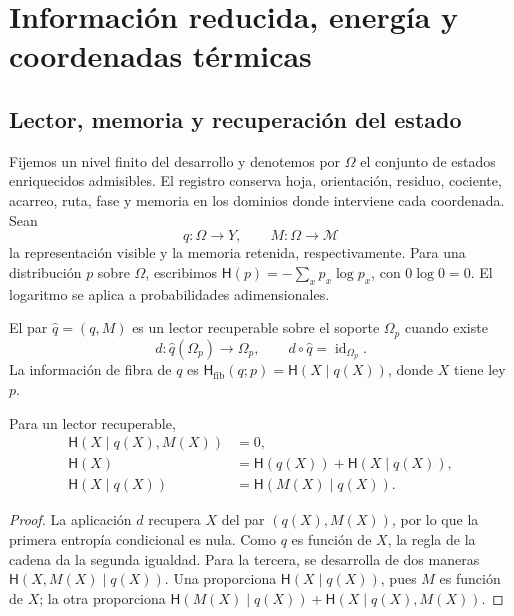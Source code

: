 \section{Información reducida, energía y coordenadas térmicas}

\subsection{Lector, memoria y recuperación del estado}

Fijemos un nivel finito del desarrollo y denotemos por \(\Omega\) el
conjunto de estados enriquecidos admisibles. El registro conserva hoja,
orientación, residuo, cociente, acarreo, ruta, fase y memoria en los
dominios donde interviene cada coordenada. Sean
\[
 q:\Omega\longrightarrow Y,\qquad
 M:\Omega\longrightarrow\mathcal M
\]
la representación visible y la memoria retenida, respectivamente. Para una
distribución \(p\) sobre \(\Omega\), escribimos
\(\mathsf H(p)=-\sum_xp_x\log p_x\), con \(0\log0=0\).
El logaritmo se aplica a probabilidades adimensionales.

\begin{definition}
El par \(\widehat q=(q,M)\) es un lector recuperable sobre el soporte
\(\Omega_p\) cuando existe
\[
 d:\widehat q(\Omega_p)\longrightarrow\Omega_p,
 \qquad d\circ\widehat q=\operatorname{id}_{\Omega_p}.
\]
La información de fibra de \(q\) es
\(\mathsf H_{\mathrm{fib}}(q;p)=\mathsf H(X\mid q(X))\), donde
\(X\) tiene ley \(p\).
\end{definition}

\begin{proposition}
Para un lector recuperable,
\begin{align}
 \mathsf H(X\mid q(X),M(X))&=0,\\
 \mathsf H(X)&=\mathsf H(q(X))+\mathsf H(X\mid q(X)),\\
 \mathsf H(X\mid q(X))&=\mathsf H(M(X)\mid q(X)).
 \label{eq:ii-kb-aut-fibra}
\end{align}
\end{proposition}
\begin{proof}
La aplicación \(d\) recupera \(X\) del par \((q(X),M(X))\),
por lo que la primera entropía condicional es nula. Como \(q\) es
función de \(X\), la regla de la cadena da la segunda igualdad.
Para la tercera, se desarrolla de dos maneras
\(\mathsf H(X,M(X)\mid q(X))\). Una proporciona
\(\mathsf H(X\mid q(X))\), pues \(M\) es función de \(X\);
la otra proporciona
\(\mathsf H(M(X)\mid q(X))+\mathsf H(X\mid q(X),M(X))\).
\end{proof}

